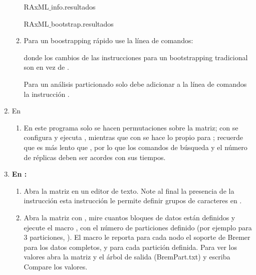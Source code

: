\begin{enumerate}
\begin{enumerate}
  	RAxML$\_$info.resultados 

  	RAxML$\_$bootstrap.resultados


	\item Para un boostrapping r\'apido use la l\'inea de comandos:


	donde los cambios de las instrucciones para un bootstrapping tradicional son  en vez de . 

	Para un an\'alisis particionado solo debe adicionar a la l\'inea de comandos la instrucci\'on .

	\end{enumerate}

\item En 
	\begin{enumerate}
	\item  En este programa solo se hacen permutaciones sobre la matriz; con  se configura y ejecuta , mientras que con   se hace lo propio para ;
	recuerde que  es m\'as lento que , por lo que los comandos de b\'usqueda y el n\'umero de r\'eplicas deben ser acordes con sus tiempos.

	\end{enumerate}


\item \textbf{En :}
	\begin{enumerate}
	\item  Abra la matriz  en un editor de texto. Note al final la presencia de la instrucci\'on 
	esta instrucci\'on le permite definir grupos de caracteres en .
	\item  Abra la matriz con , mire cuantos bloques de datos est\'an definidos y ejecute el macro , con el n\'umero de particiones definido (por ejemplo para 3 particiones, ). El macro le reporta para cada nodo el soporte de Bremer para los datos completos, y para cada partici\'on definida. Para ver los valores abra la matriz y el \'arbol de salida (BremPart.txt) y escriba 
	Compare los valores.
	\end{enumerate}




\end{enumerate}



